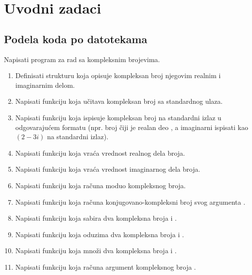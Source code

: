 \chapter{Uvodni zadaci}

\section{Podela koda po datotekama}

\begin{Exercise}[label=1_01] %
Napisati program za rad sa kompleksnim brojevima.
\begin{enumerate}
\item Definisati strukturu  koja opisuje kompleksan broj njegovim realnim i imaginarnim delom.
\item Napisati funkciju  koja učitava kompleksan broj sa standardnog ulaza.
\item Napisati funkciju  koja ispisuje kompleksan broj na standardni izlaz u odgovarajućem formatu (npr. broj čiji je realan deo , a imaginarni  ispisati kao $(2 - 3 i)$ na standardni izlaz).
\item Napisati funkciju  koja vraća vrednost realnog dela broja.
\item Napisati funkciju  koja vraća vrednost imaginarnog dela broja.
\item Napisati funkciju  koja računa moduo kompleksnog broja.
\item Napisati funkciju  koja računa konjugovano-kompleksni broj svog argumenta .
\item Napisati funkciju  koja sabira dva kompleksna broja  i .
\item Napisati funkciju  koja oduzima dva kompleksna broja  i .
\item Napisati funkciju  koja množi dva kompleksna broja  i .
\item Napisati funkciju  koja računa argument kompleksnog broja .
\end{enumerate}


\end{Exercise}
